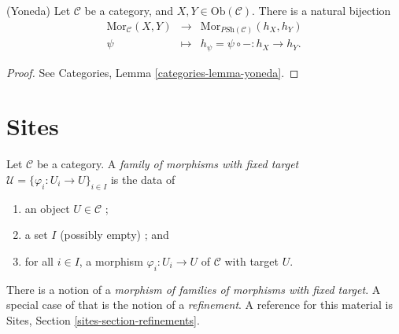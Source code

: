 \begin{lemma}
\label{lemma-yoneda}
(Yoneda)
Let $\mathcal{C}$ be a category, and $X,Y \in
\text{Ob}(\mathcal{C})$. There is a natural bijection
$$
\begin{matrix}
\text{Mor}_\mathcal{C}(X,Y) &
\longrightarrow &
\text{Mor}_{\textit{PSh}(\mathcal{C})} (h_X,h_Y) \\
\psi &
\longmapsto &
h_\psi = \psi \circ - : h_X \to h_Y.
\end{matrix}
$$
\end{lemma}

\begin{proof}
See
Categories, Lemma \ref{categories-lemma-yoneda}.
\end{proof}




\section{Sites}
\label{section-sites}


\begin{definition}
\label{definition-family-morphisms-fixed-target}
Let $\mathcal{C}$ be a category. A {\it family of morphisms with fixed target}
$\mathcal{U} = \{\varphi_i : U_i \to U\}_{i\in I}$ is the data of
\begin{enumerate}
\item an object $U \in \mathcal{C}$ ;
\item a set $I$ (possibly empty) ; and
\item for all $i\in I$, a morphism $\varphi_i : U_i \to U$ of $\mathcal{C}$
with target $U$.
\end{enumerate}
\end{definition}

\noindent
There is a notion of a {\it morphism of families of morphisms with fixed
target}. A special case of that is the notion of a {\it refinement}.
A reference for this material is
Sites, Section \ref{sites-section-refinements}.

